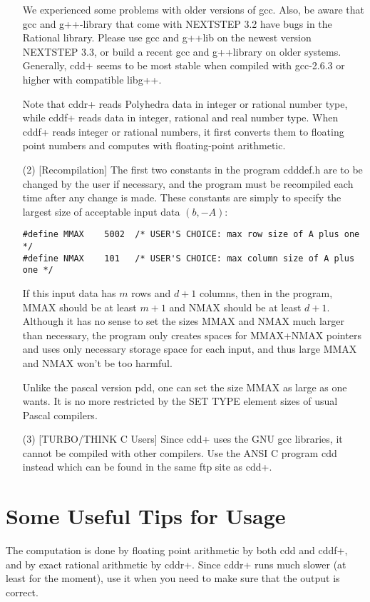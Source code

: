 \documentclass[11pt]{article}
\begin{document}
\begin{itemize}
We experienced some problems with older versions of gcc.    Also, be aware that
gcc and g++-library that come with NEXTSTEP 3.2 have bugs in the Rational library.
Please use gcc and g++lib on the newest version NEXTSTEP 3.3, or build a recent
gcc and g++library on older systems.
Generally, cdd+ seems to be most stable when compiled with gcc-2.6.3 or higher 
with compatible libg++. 

Note that cddr+ reads Polyhedra data in integer or rational
number type, while cddf+ reads data in integer, rational and real number type.
When cddf+ reads integer or rational numbers, it first converts them
to floating point numbers and computes with floating-point arithmetic.

\item[(2)] [Recompilation] The first two constants in the program cdddef.h are to be 
changed by the user if necessary, and the program must be recompiled
each time after any change is made.   These constants are simply
to specify the largest size of acceptable input data $(b, -A)$: 
\begin{verbatim}
#define MMAX    5002  /* USER'S CHOICE: max row size of A plus one */
#define NMAX    101   /* USER'S CHOICE: max column size of A plus one */
\end{verbatim}
If this input data has $m$ rows and $d+1$ columns, then in the program,
MMAX should be at least $m+1$ and NMAX should be at least
$d+1$.  Although it has no sense to set the sizes MMAX and NMAX much larger
than necessary, the program only creates spaces for MMAX+NMAX pointers
and uses only necessary storage space for each input, and
thus large MMAX and NMAX won't be too harmful.

Unlike the pascal version pdd, one can set the size MMAX as large as one
wants.  It is no more restricted by the SET TYPE element sizes of 
usual Pascal compilers.

\item[(3)] [TURBO/THINK C Users]   Since cdd+ uses the GNU gcc libraries,
it cannot be compiled with other compilers.  Use  the ANSI C program cdd
instead which can be found in the same ftp site as cdd+.
\end{itemize}


\section{Some  Useful Tips for Usage}  \label{TIPS}

The computation is done by floating point arithmetic by both cdd and cddf+,
and by exact rational arithmetic by cddr+. 
Since cddr+ runs much slower (at least for the moment),
use it when you need to make sure that the output is correct.
\end{document}
